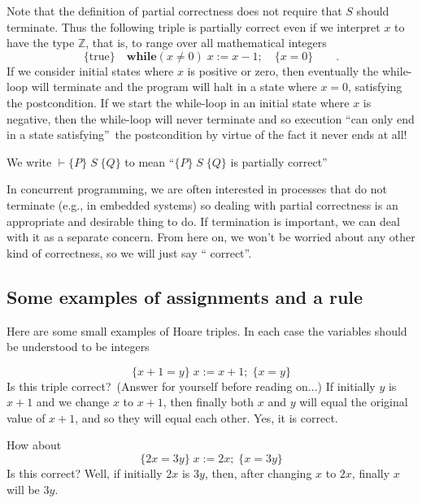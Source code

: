 \documentclass[muchmore,11pt]{article}%
\begin{document}
Note that the definition of partial correctness does not require that $S$
should terminate. Thus the following triple is partially correct even if we
interpret $x$ to have the type $\mathbb{Z}$, that is, to range over all
mathematical integers%
\[
\{\mathrm{true}\}\quad\mathbf{while}(x\neq0)\;x:=x-1;\quad\{x=0\}\qquad
\text{.}%
\]
If we consider initial states where $x$ is positive or zero, then eventually
the while-loop will terminate and the program will halt in a state where
$x=0$, satisfying the postcondition. If we start the while-loop in an initial
state where $x$ is negative, then the while-loop will never terminate and so
execution \textquotedblleft can only end in a state
satisfying\textquotedblright\ the postcondition by virtue of the fact it never
ends at all!

We write $\vdash\{P\}\;S\;\{Q\}$ to mean \textquotedblleft$\{P\}\;S\;\{Q\}$ is
partially correct\textquotedblright

In concurrent programming, we are often interested in processes that do not
terminate (e.g., in embedded systems) so dealing with partial correctness is
an appropriate and desirable thing to do. If termination is important, we can
deal with it as a separate concern. From here on, we won't be worried about
any other kind of correctness, so we will just say \textquotedblleft
correct\textquotedblright.

\subsection{Some examples of assignments and a rule}

Here are some small examples of Hoare triples. In each case the variables
should be understood to be integers%

\[
\{x+1=y\}\;x:=x+1;\;\{x=y\}
\]
Is this triple correct?\ (Answer for yourself before reading on...) If
initially $y$ is $x+1$ and we change $x$ to $x+1$, then finally both $x$ and
$y$ will equal the original value of $x+1$, and so they will equal each other.
Yes, it is correct.

How about%
\[
\{2x=3y\}\;x:=2x;\;\{x=3y\}
\]
Is this correct? Well, if initially $2x$ is $3y$, then, after changing $x$ to
$2x$, finally $x$ will be $3y$.
\end{document}

